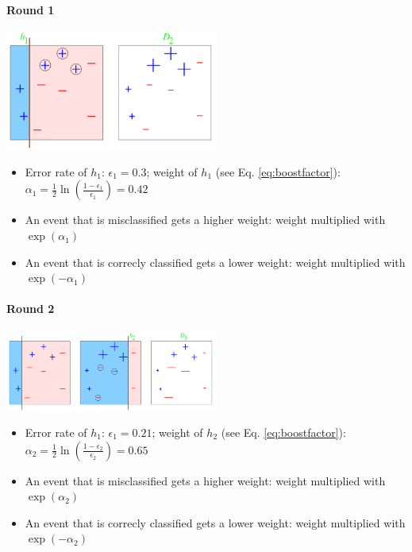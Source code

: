 \begin{appendices}
\paragraph{Round 1}
\begin{center}
\includegraphics[width=7cm]{appendix/img/adaboost2.png}
\end{center}

\begin{itemize}
\item Error rate of $h_1$: $\epsilon_1 = 0.3$; weight of $h_1$ (see Eq. \ref{eq:boostfactor}): $\alpha_1 = \frac{1}{2} \ln\left(\frac{1-\epsilon_1}{\epsilon_1}\right) = 0.42$
\item An event that is misclassified gets a higher weight: weight multiplied with $\exp(\alpha_1)$
\item An event that is correcly classified gets a lower weight: weight multiplied with $\exp(-\alpha_1)$
\end{itemize}

\paragraph{Round 2}

\begin{center}
\includegraphics[width=7cm]{appendix/img/adaboost3.png}
\end{center}

\begin{itemize}
\item Error rate of $h_1$: $\epsilon_1 = 0.21$; weight of $h_2$ (see Eq. \ref{eq:boostfactor}): $\alpha_2 = \frac{1}{2} \ln\left(\frac{1-\epsilon_2}{\epsilon_2}\right) = 0.65$
\item An event that is misclassified gets a higher weight: weight multiplied with $\exp(\alpha_2)$
\item An event that is correcly classified gets a lower weight: weight multiplied with $\exp(-\alpha_2)$
\end{itemize}


\end{appendices}
